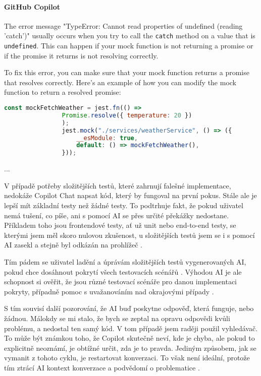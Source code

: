 \documentclass[FM,DP]{tulthesis}
\begin{document}
\begin{tcolorbox}[colback=white,colframe=black,title=Konverzace s opakovaním kódu]
			\vspace{0.6em}
			
			\paragraph{GitHub Copilot}
			The error message "TypeError: Cannot read properties of undefined (reading 'catch')" usually occurs when you try to call the \verb|catch| method on a value that is \verb|undefined|. This can happen if your mock function is not returning a promise or if the promise it returns is not resolving correctly.
			
			To fix this error, you can make sure that your mock function returns a promise that resolves correctly. Here's an example of how you can modify the mock function to return a resolved promise:
			
			\vspace{0.6em}
			
			\begin{lstlisting}[language=JavaScript]
				const mockFetchWeather = jest.fn(() =>
				Promise.resolve({ temperature: 20 })
				);
				jest.mock("./services/weatherService", () => ({
					__esModule: true,
					default: () => mockFetchWeather(),
				}));
			\end{lstlisting}
			... \cite{mocking_fail}
		\end{tcolorbox}
		
		V případě potřeby složitějších testů, které zahrnují falešné implementace, nedokáže Copilot Chat napsat kód, který by fungoval na první pokus. Stále ale je lepší mít základní testy než žádné testy. To podtrhuje fakt, že pokud uživatel nemá tušení, co píše, ani s pomocí AI se přes určité překážky nedostane. Příkladem toho jsou frontendové testy, ať už unit nebo end-to-end testy, se kterými jsem měl skoro nulovou zkušenost, u složitějších testů jsem se i s pomocí AI zasekl a stejně byl odkázán na prohlížeč \cite{canvas} \cite{firebase_auth} \cite{firebase}.

    Tím pádem se uživatel ladění a úprávám složitějších testů vygenerovaných AI, pokud chce dosáhnout pokrytí všech testovacích scénářů \cite{codecov}. Výhodou AI je ale schopnost si ověřit, že jsou různé testovací scénáře pro danou implementaci pokryty, případně pomoc s uvažanováním nad okrajovými případy \cite{TDD} \cite{mocking} \cite{mocking_fail}.
		
		S tím souvisí další pozorování, že AI buď poskytne odpověď, která funguje, nebo žádnou. Málokdy se mi stalo, že bych se zeptal na opravu odpovědi kvůli problému, a nedostal ten samý kód. V tom případě jsem raději použil vyhledávač. To může být známkou toho, že Copilot skutečně neví, kde je chyba, ale pokud to explicitně neoznámí, je obtížné určit, zda je to pravda. Jediným způsobem, jak se vymanit z tohoto cyklu, je restartovat konverzaci. To však není ideální, protože tím ztrácí AI kontext konverzace a podvědomí o problematice \cite{mocking_fail}.
		
\end{document}
